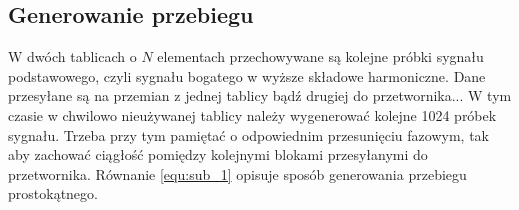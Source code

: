 \subsection{Generowanie przebiegu}
W dwóch tablicach o $N$ elementach przechowywane są kolejne próbki sygnału podstawowego, czyli sygnału bogatego w wyższe składowe harmoniczne. 
Dane przesyłane są na przemian z jednej tablicy bądź drugiej do przetwornika...
W tym czasie w chwilowo nieużywanej tablicy należy wygenerować kolejne 1024 próbek sygnału. Trzeba przy tym pamiętać o odpowiednim przesunięciu fazowym, tak aby zachować ciągłość pomiędzy kolejnymi blokami przesyłanymi do przetwornika. Równanie \ref{equ:sub_1} opisuje sposób generowania przebiegu prostokątnego.

